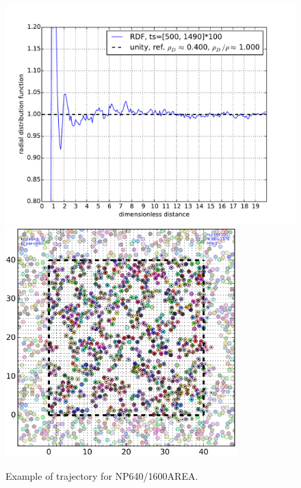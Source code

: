 \documentclass[10pt, a4paper]{report}
\begin{document}
\begin{figure}
  \centering
  \includegraphics[width=\textwidth]{figures/local_hetero.pdf}
  \includegraphics[width=0.8\textwidth]{figures/NP640_FENE_exam.png}
  \caption{Example of trajectory for NP640/1600AREA.}
  \label{fig:traj_exam}
\end{figure}

\end{document}
